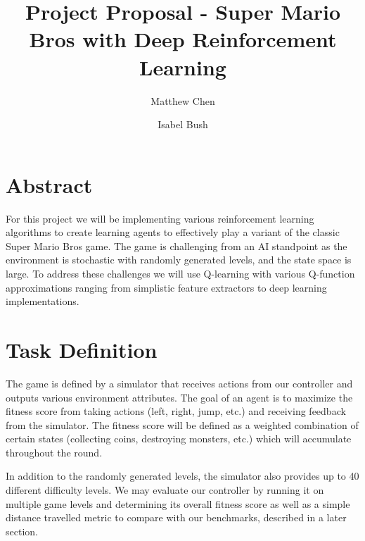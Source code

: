\documentclass[12pt]{article}
\begin{document}
\nocite{*}

\title{Project Proposal - Super Mario Bros with Deep Reinforcement Learning}

\author{
  Matthew Chen
  \and
  Isabel Bush
}
\date{}
\maketitle


\section{Abstract}

For this project we will be implementing various reinforcement learning algorithms to create learning agents to effectively play a variant of the classic Super Mario Bros game. The game is challenging from an AI standpoint as the environment is stochastic with randomly generated levels, and the state space is large. To address these challenges we will use Q-learning with various Q-function approximations ranging from simplistic feature extractors to deep learning implementations.


\section{Task Definition}

The game is defined by a simulator that receives actions from our controller and outputs various environment attributes. The goal of an agent is to maximize the fitness score from taking actions (left, right, jump, etc.) and receiving feedback from the simulator. The fitness score will be defined as a weighted combination of certain states (collecting coins, destroying monsters, etc.) which will accumulate throughout the round.


In addition to the randomly generated levels, the simulator also provides up to 40 different difficulty levels. We may evaluate our controller by running it on multiple game levels and determining its overall fitness score as well as a simple distance travelled metric to compare with our benchmarks, described in a later section.
\end{document}
